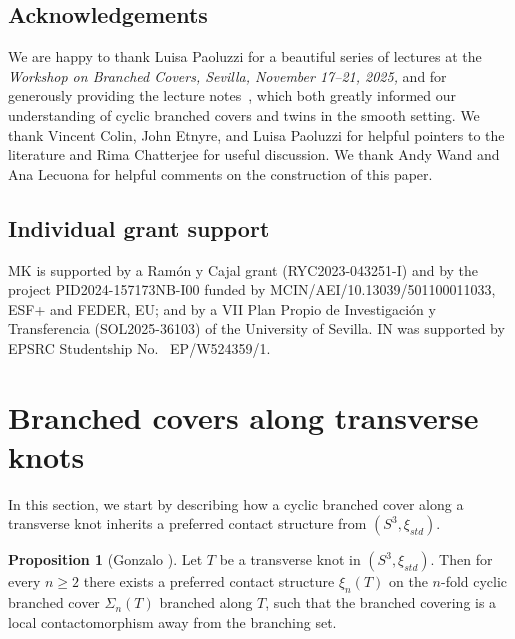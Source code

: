 \documentclass[11pt]{amsart}
\theoremstyle{definition}
\theoremstyle{definition}
\theoremstyle{definition}
\theoremstyle{definition}
\newtheorem{proposition}[theorem]{Proposition}
\begin{document}
\subsection*{Acknowledgements}
We are happy to thank Luisa Paoluzzi for a beautiful series of lectures at the \textit{Workshop on Branched Covers, Sevilla, November 17–21, 2025,} and for generously providing the lecture notes~\cite{Paoluzzi_survey}, which both greatly informed our understanding of cyclic branched covers and twins in the smooth setting. We thank Vincent Colin, John Etnyre, and Luisa Paoluzzi for helpful pointers to the literature and Rima Chatterjee for useful discussion. We thank Andy Wand and Ana Lecuona for helpful comments on the construction of this paper.

\subsection*{Individual grant support}
MK is supported by a Ram\'on y Cajal grant (RYC2023-043251-I) and by the project PID2024-157173NB-I00 funded by MCIN/AEI/10.13039/501100011033, ESF+ and FEDER, EU; and by a VII Plan Propio de Investigación y Transferencia (SOL2025-36103) of the University of Sevilla. IN was supported by EPSRC Studentship No. ~EP/W524359/1.

\section{Branched covers along transverse knots}\label{sec:definition_covers}
In this section, we start by describing how a cyclic branched cover along a transverse knot inherits a preferred contact structure from $(S^3,\xi_{std})$.

\begin{proposition}[Gonzalo \cite{Gonzalo}]
    Let $T$ be a transverse knot in $(S^3,\xi_{std})$. Then for every $n\geq2$ there exists a preferred contact structure $\xi_n(T)$ on the $n$-fold cyclic branched cover $\Sigma_n(T)$ branched along $T$, such that the branched covering is a local contactomorphism away from the branching set.
\end{proposition}
\end{document}
